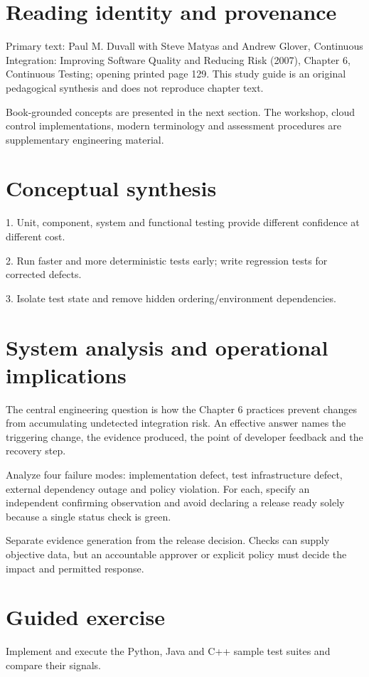 \documentclass[11pt,letterpaper]{article}
\begin{document}
\makedoctitle
\makedocsummary
\tableofcontents
\clearpage
\section{Reading identity and provenance}
Primary text: Paul M. Duvall with Steve Matyas and Andrew Glover, Continuous Integration: Improving Software Quality and Reducing Risk (2007), Chapter 6, Continuous Testing; opening printed page 129. This study guide is an original pedagogical synthesis and does not reproduce chapter text.

Book-grounded concepts are presented in the next section. The workshop, cloud control implementations, modern terminology and assessment procedures are supplementary engineering material.

\section{Conceptual synthesis}
1. Unit, component, system and functional testing provide different confidence at different cost.

2. Run faster and more deterministic tests early; write regression tests for corrected defects.

3. Isolate test state and remove hidden ordering/environment dependencies.

\section{System analysis and operational implications}
The central engineering question is how the Chapter 6 practices prevent changes from accumulating undetected integration risk. An effective answer names the triggering change, the evidence produced, the point of developer feedback and the recovery step.

Analyze four failure modes: implementation defect, test infrastructure defect, external dependency outage and policy violation. For each, specify an independent confirming observation and avoid declaring a release ready solely because a single status check is green.

Separate evidence generation from the release decision. Checks can supply objective data, but an accountable approver or explicit policy must decide the impact and permitted response.

\section{Guided exercise}
Implement and execute the Python, Java and C++ sample test suites and compare their signals.
\end{document}
